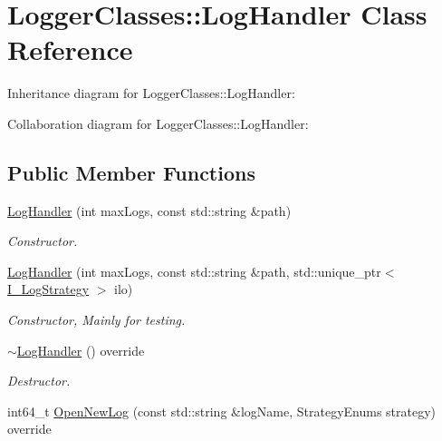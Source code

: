 \hypertarget{classLoggerClasses_1_1LogHandler}{}\section{Logger\+Classes\+::Log\+Handler Class Reference}
\label{classLoggerClasses_1_1LogHandler}


Inheritance diagram for Logger\+Classes\+::Log\+Handler\+:


Collaboration diagram for Logger\+Classes\+::Log\+Handler\+:
\subsection*{Public Member Functions}
\begin{DoxyCompactItemize}
\item 
\mbox{\hyperlink{classLoggerClasses_1_1LogHandler_a6541f77d814d526ff05628da3940573e}{Log\+Handler}} (int max\+Logs, const std\+::string \&path)
\begin{DoxyCompactList}\small\item\em Constructor. \end{DoxyCompactList}\item 
\mbox{\label{classLoggerClasses_1_1LogHandler_a5ef57687394c628a2c8a0bf70c758de5}} 
\mbox{\hyperlink{classLoggerClasses_1_1LogHandler_a5ef57687394c628a2c8a0bf70c758de5}{Log\+Handler}} (int max\+Logs, const std\+::string \&path, std\+::unique\+\_\+ptr$<$ \mbox{\hyperlink{classLoggerClasses_1_1I__LogStrategy}{I\+\_\+\+Log\+Strategy}} $>$ ilo)
\begin{DoxyCompactList}\small\item\em Constructor, Mainly for testing. \end{DoxyCompactList}\item 
\mbox{\label{classLoggerClasses_1_1LogHandler_ac2411d79efcefd3d45436e2abbb9727d}} 
\mbox{\hyperlink{classLoggerClasses_1_1LogHandler_ac2411d79efcefd3d45436e2abbb9727d}{$\sim$\+Log\+Handler}} () override
\begin{DoxyCompactList}\small\item\em Destructor. \end{DoxyCompactList}\item 
int64\+\_\+t \mbox{\hyperlink{classLoggerClasses_1_1LogHandler_a78959a9c67210c64511bd18b7a3c8861}{Open\+New\+Log}} (const std\+::string \&log\+Name, Strategy\+Enums strategy) override

\end{DoxyCompactItemize}
